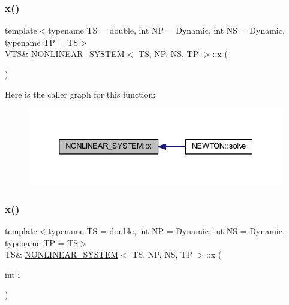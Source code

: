 \mbox{\label{class_n_o_n_l_i_n_e_a_r___s_y_s_t_e_m_a74d8eaa53624eae38a6f2e6b5bdd4381}} 
\subsubsection{\texorpdfstring{x()}{x()}\hspace{0.1cm}{\footnotesize\ttfamily [1/2]}}
{\footnotesize\ttfamily template$<$typename TS = double, int NP = Dynamic, int NS = Dynamic, typename TP = TS$>$ \\
V\+TS\& \mbox{\hyperlink{class_n_o_n_l_i_n_e_a_r___s_y_s_t_e_m}{N\+O\+N\+L\+I\+N\+E\+A\+R\+\_\+\+S\+Y\+S\+T\+EM}}$<$ TS, NP, NS, TP $>$\+::x (\begin{DoxyParamCaption}{ }\end{DoxyParamCaption})\hspace{0.3cm}{\ttfamily [inline]}}

Here is the caller graph for this function\+:
\nopagebreak
\begin{figure}[H]
\begin{center}
\leavevmode
\includegraphics[width=332pt]{class_n_o_n_l_i_n_e_a_r___s_y_s_t_e_m_a74d8eaa53624eae38a6f2e6b5bdd4381_icgraph}
\end{center}
\end{figure}
\mbox{\label{class_n_o_n_l_i_n_e_a_r___s_y_s_t_e_m_aabd6041ce7d6aaad8ce55e03c2efde1e}} 
\subsubsection{\texorpdfstring{x()}{x()}\hspace{0.1cm}{\footnotesize\ttfamily [2/2]}}
{\footnotesize\ttfamily template$<$typename TS = double, int NP = Dynamic, int NS = Dynamic, typename TP = TS$>$ \\
TS\& \mbox{\hyperlink{class_n_o_n_l_i_n_e_a_r___s_y_s_t_e_m}{N\+O\+N\+L\+I\+N\+E\+A\+R\+\_\+\+S\+Y\+S\+T\+EM}}$<$ TS, NP, NS, TP $>$\+::x (\begin{DoxyParamCaption}\item[{int}]{i }\end{DoxyParamCaption})\hspace{0.3cm}{\ttfamily [inline]}}



